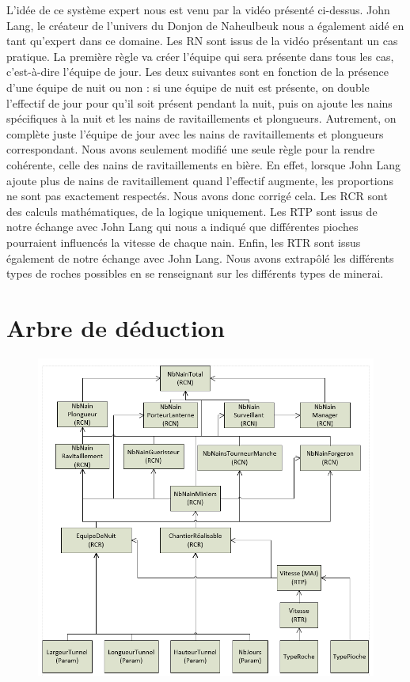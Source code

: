 \documentclass[a4paper,10pt]{report}
\begin{document}
L'idée de ce système expert nous est venu par la vidéo présenté ci-dessus. John Lang, le créateur de l’univers du Donjon de Naheulbeuk nous a également aidé en tant qu'expert dans ce domaine. 
Les RN sont issus de la vidéo présentant un cas pratique. La première règle va créer l'équipe qui sera présente dans tous les cas, c'est-à-dire l'équipe de jour. Les deux suivantes sont en fonction de la présence d'une équipe de nuit ou non : si une équipe de nuit est présente, on double l'effectif de jour pour qu'il soit présent pendant la nuit, puis on ajoute les nains spécifiques à la nuit et les nains de ravitaillements et plongueurs. Autrement, on complète juste l'équipe de jour avec les nains de ravitaillements et plongueurs correspondant.
Nous avons seulement modifié une seule règle pour la rendre cohérente, celle des nains de ravitaillements en bière. En effet, lorsque John Lang ajoute plus de nains de ravitaillement quand l'effectif augmente, les proportions ne sont pas exactement respectés. Nous avons donc corrigé cela.
Les RCR sont des calculs mathématiques, de la logique uniquement.
Les RTP sont issus de notre échange avec John Lang qui nous a indiqué que différentes pioches pourraient influencés la vitesse de chaque nain.
Enfin, les RTR sont issus également de notre échange avec John Lang. Nous avons extrapôlé les différents types de roches possibles en se renseignant sur les différents types de minerai.
\newpage
\section{Arbre de déduction}

\begin{figure}[!htp]
  \centerline{\includegraphics[scale=1]{arbre_inference}}
\end{figure}
\end{document}
